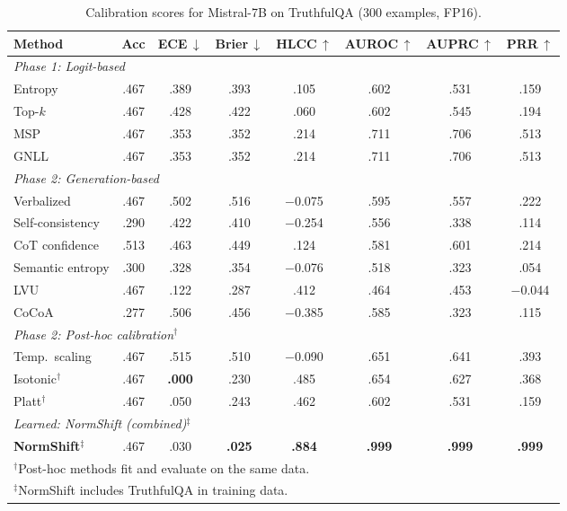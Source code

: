 \documentclass[11pt,a4paper]{article}
\begin{document}
\begin{table}[H]
\centering
\caption{Calibration scores for Mistral-7B on TruthfulQA (300 examples, FP16).}
\label{tab:full-calibration-mistral-7b}
\small
\begin{tabular}{@{}lccccccc@{}}
\toprule
Method & Acc & ECE\,$\downarrow$ & Brier\,$\downarrow$ & HLCC\,$\uparrow$
       & AUROC\,$\uparrow$ & AUPRC\,$\uparrow$ & PRR\,$\uparrow$ \\
\midrule
\multicolumn{8}{l}{\emph{Phase 1: Logit-based}} \\
Entropy                  & .467 & .389 & .393 & .105
                 & .602 & .531 & .159 \\
Top-$k$                  & .467 & .428 & .422 & .060
                 & .602 & .545 & .194 \\
MSP                      & .467 & .353 & .352 & .214
                 & .711 & .706 & .513 \\
GNLL                     & .467 & .353 & .352 & .214
                 & .711 & .706 & .513 \\
\midrule
\multicolumn{8}{l}{\emph{Phase 2: Generation-based}} \\
Verbalized               & .467 & .502 & .516 & $-$0.075
                 & .595 & .557 & .222 \\
Self-consistency         & .290 & .422 & .410 & $-$0.254
                 & .556 & .338 & .114 \\
CoT confidence           & .513 & .463 & .449 & .124
                 & .581 & .601 & .214 \\
Semantic entropy         & .300 & .328 & .354 & $-$0.076
                 & .518 & .323 & .054 \\
LVU                      & .467 & .122 & .287 & .412
                 & .464 & .453 & $-$0.044 \\
CoCoA                    & .277 & .506 & .456 & $-$0.385
                 & .585 & .323 & .115 \\
\midrule
\multicolumn{8}{l}{\emph{Phase 2: Post-hoc calibration$^\dagger$}} \\
Temp.\ scaling           & .467 & .515 & .510 & $-$0.090
                 & .651 & .641 & .393 \\
Isotonic$^\dagger$       & .467 & \textbf{.000} & .230 & .485
                 & .654 & .627 & .368 \\
Platt$^\dagger$          & .467 & .050 & .243 & .462
                 & .602 & .531 & .159 \\
\midrule
\multicolumn{8}{l}{\emph{Learned: NormShift (combined)$^\ddagger$}} \\
\textbf{NormShift}$^\ddagger$ & .467 & .030 & \textbf{.025} & \textbf{.884}
                 & \textbf{.999} & \textbf{.999} & \textbf{.999} \\
\bottomrule
\multicolumn{8}{l}{\scriptsize $^\dagger$Post-hoc methods fit and evaluate on the same data.} \\
\multicolumn{8}{l}{\scriptsize $^\ddagger$NormShift includes TruthfulQA in training data.}
\end{tabular}
\end{table}
\end{document}
